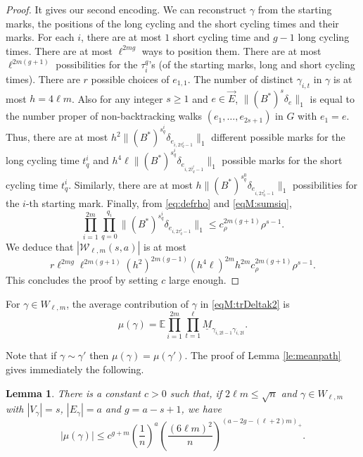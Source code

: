 \documentclass[11pt]{article}
\newtheorem{lemma}{Lemma}
\newcommand{\dE}{\mathbb {E}}
\newcommand{\cE}{E}
\newcommand{\cW}{\mathcal {W}}
\newcommand{\ABS}[1]{{{\left| #1 \right|}}} %
\newcommand{\PAR}[1]{{{\left(#1\right)}}} %
\newcommand{\1}{1\!\!{\sf I}}\newcommand{\IND}{\1}
\begin{document}
\begin{proof}
It gives our second encoding. We can reconstruct $\gamma$ from the starting marks, the positions of the long cycling  and the short cycling times and their marks. For each $i$, there are at most $1$ short cycling time and $ g-1$ long cycling times. There are at most $ \ell ^{2m g }$ ways to position them. There are at most $\ell^{2m (g+1)}$ possibilities for the $\tau_i^q$'s (of the starting marks, long and short cycling times).  There are $r$ possible choices of $e_{1,1}$.  The number of distinct $\gamma_{i,t}$ in $\gamma$ is at most $h = 4 \ell m$. Also for any integer $s\geq 1$ and $e \in \vec E$,
$
\| (B^*)^s \delta_e \|_1
$ is equal to the number proper of non-backtracking walks $(e_1, \ldots , e_{2s+1})$ in $G$ with $e_1 = e$.  Thus, there are at most $h^2 \|(B^*)^{s^i_q} \delta_{e_{i,2\tau^i_q-1}}\|_1$ different possible marks for the long cycling time $t^i_q$ and $h^4\ell \|(B^*)^{s^i_q} \delta_{e_{i,2\hat \tau^i_q-1}}\|_1$ possible marks for the short cycling time $t^i_q$. Similarly, there are at most $h\|(B^*)^{s^0_q} \delta_{e_{i,2\hat \tau^i_0-1}}\|_1$ possibilities for the $i$-th starting mark.  Finally, from \eqref{eq:defrho} and \eqref{eqM:sumsiq},
$$
\prod_{i = 1}^{2m} \prod_{ q = 0} ^{q_i} \|(B^*)^{s^i_q} \delta_{e_{i,2  \tau^i_q-1}}\|_1 \leq c_\rho^{2 m (g+1)}\rho^{s -1}.
$$
We deduce that    $| \cW _{\ell,m} (s,a) | $ is at most
$$
 r  \ell ^{2m g} \ell^{2m (g+1)}\PAR{h^{2}}^ {2m(g-1)} \PAR{h^4\ell}^{2m} h^{2m} c_\rho^{2 m (g+1)}\rho^{s -1}. 
$$
This concludes the proof by setting $c$ large enough. \end{proof}


For $\gamma \in W_{\ell,m}$, the average contribution of $\gamma$ in \eqref{eqM:trDeltak2} is
\begin{equation}\label{eqM:defmug}
\mu(\gamma) =   \dE \prod_{i=1}^{2m}  \prod_{t=1}^{\ell} \underline M_{\gamma_{i,2t-1}  \gamma_{i,2t}}.
\end{equation}

Note that if $\gamma \sim \gamma'$ then $\mu(\gamma) = \mu(\gamma')$. The proof of Lemma \ref{le:meanpath} gives immediately the following. 
\begin{lemma}\label{leM:meanpath}
There is a constant $c > 0$ such that, if $2 \ell m \leq \sqrt{  n}$ and $\gamma \in W_{\ell,m} $ with $|V_\gamma| = s$, $|\cE_\gamma |= a$ and $g = a - s+1$, we have
$$
\ABS{ \mu(\gamma)} \leq  c^{g + m}  \PAR{\frac{ 1 }{n} }^a   \PAR{\frac{ (6\ell m)^2 }{n} } ^{  (a - 2g - (\ell+2) m)_+}.  
$$
\end{lemma}
\end{document}
